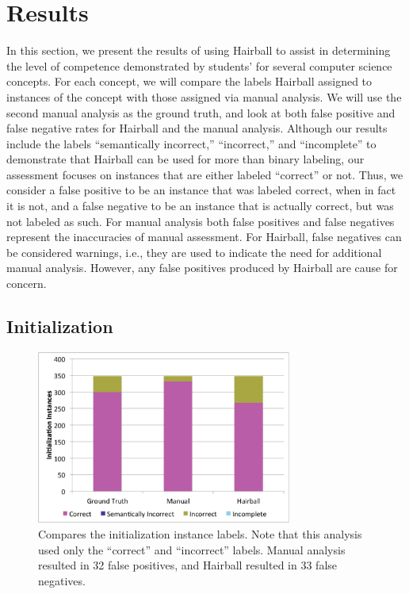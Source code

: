 \section{Results}

In this section, we present the results of using Hairball to assist in
determining the level of competence demonstrated by students'  for
several computer science concepts. For each concept, we will compare the labels
Hairball assigned to instances of the concept with those assigned via manual
analysis. We will use the second manual analysis as the ground truth, and look
at both false positive and false negative rates for Hairball and the manual
analysis. Although our results include the labels ``semantically incorrect,''
``incorrect,'' and ``incomplete'' to demonstrate that Hairball can be used for
more than binary labeling, our assessment focuses on instances that are either
labeled ``correct'' or not. Thus, we consider a false positive to be an
instance that was labeled correct, when in fact it is not, and a false negative
to be an instance that is actually correct, but was not labeled as such. For
manual analysis both false positives and false negatives represent the
inaccuracies of manual assessment. For Hairball, false negatives can be
considered warnings, i.e., they are used to indicate the need for additional
manual analysis. However, any false positives produced by Hairball are cause
for concern.


\subsection{Initialization}
\begin{figure}[!t]
\centering \includegraphics[trim=.3in .15in .3in .15in, clip,
  width=3.3in]{graphs/AutoInit.eps}
\caption{Compares the initialization instance labels. Note that this analysis
  used only the ``correct'' and ``incorrect'' labels. Manual analysis resulted
  in 32 false positives, and Hairball resulted in 33 false negatives.}
\end{figure}

